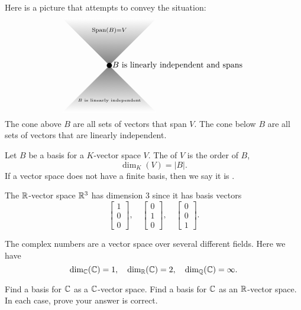 \documentclass{ximera}
\begin{document}
Here is a picture that attempts to convey the situation:
\[
\begin{tikzpicture}
  \draw[white,thin,shading = axis, top color = white, bottom color = gray] (-2,2) -- (0,0)-- (2,2) -- (-2,2) -- cycle;
  \draw[white,thin,shading = axis, bottom color = white, top color = gray] (-2,-2) -- (0,0)-- (2,-2) -- (-2,-2) -- cycle;
  \filldraw (0,0) circle (3pt);
  \node[right] at (0,0) {$B$ is linearly independent and spans};
  \node at (0,1.5) {$\scriptstyle \Span(B) = V$};
  \node at (0,-1.5) {\tiny $B$  is linearly independent};
\end{tikzpicture}
\]
The cone above $B$ are all sets of vectors that span $V$. The cone
below $B$ are all sets of vectors that are linearly independent.



\begin{definition}
  Let $B$ be a basis for a $K$-vector space $V$. The  of $V$ is the order of $B$,
  \[
  \dim_K(V) = |B|.
  \]
  If a vector space does not have a finite basis, then we say it is
  .
\end{definition}


\begin{example}
  The $\mathbb R$-vector space $\mathbb R^3$ has dimension $3$ since it has basis vectors
  \[
  \begin{bmatrix}
    1\\
    0\\
    0
  \end{bmatrix},\quad
  \begin{bmatrix}
    0\\
    1\\
    0
  \end{bmatrix},\quad
   \begin{bmatrix}
    0\\
    0\\
    1
  \end{bmatrix}.
  \]
\end{example}


\begin{example}
  The complex numbers are a vector space over several different
  fields. Here we have
  \[
  \dim_{\mathbb C}(\mathbb C) = 1, \quad \dim_{\mathbb R}(\mathbb C) = 2, \quad \dim_{\mathbb Q}(\mathbb C) =\infty.
  \]
\end{example}

\begin{exercise}
  Find a basis for $\mathbb C$ as a $\mathbb C$-vector space. Find a basis for $\mathbb C$
  as an $\mathbb R$-vector space. In each case, prove your answer is correct.
\end{exercise}
\end{document}
